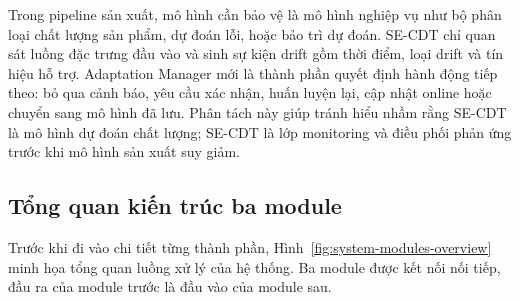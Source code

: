 Trong pipeline sản xuất, mô hình cần bảo vệ là mô hình nghiệp vụ như bộ phân loại chất lượng sản phẩm, dự đoán lỗi, hoặc bảo trì dự đoán. SE-CDT chỉ quan sát luồng đặc trưng đầu vào và sinh sự kiện drift gồm thời điểm, loại drift và tín hiệu hỗ trợ. Adaptation Manager mới là thành phần quyết định hành động tiếp theo: bỏ qua cảnh báo, yêu cầu xác nhận, huấn luyện lại, cập nhật online hoặc chuyển sang mô hình đã lưu. Phân tách này giúp tránh hiểu nhầm rằng SE-CDT là mô hình dự đoán chất lượng; SE-CDT là lớp monitoring và điều phối phản ứng trước khi mô hình sản xuất suy giảm.

\subsection{Tổng quan kiến trúc ba module}
\label{sec:system-overview}

Trước khi đi vào chi tiết từng thành phần, Hình~\ref{fig:system-modules-overview} minh họa tổng quan luồng xử lý của hệ thống. Ba module được kết nối nối tiếp, đầu ra của module trước là đầu vào của module sau.

